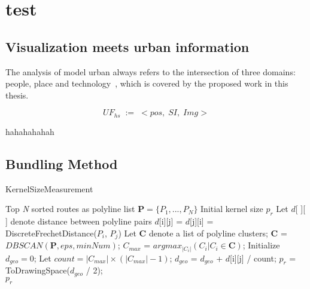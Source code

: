 \chapter{test}


\section{Visualization meets urban information}

 
The analysis of model urban always refers to the intersection of three domains: people, place and technology~\cite{foth2011urban}, which is covered by the proposed work in this thesis.

\vspace*{-2mm}
\begin{equation}
\label{c1_eq_sv}
UF_{hs} \; := \; <pos, \; SI, \; Img>
\end{equation}


hahahahahah
\section{Bundling Method}
\label{sec:bundling}
\begin{algorithm}[h]
	\caption{KernelSizeMeasurement}\label{al:kernel_size_measurement}
	\begin{algorithmic}[1]
		\Require Top \textit{N} sorted routes as polyline list $\textbf{P} = \{P_1, ..., P_N\}$
		\Ensure Initial kernel size $p_r$		
		\State Let $d$[ ][ ] denote distance between polyline pairs
		\State $d$[i][j] = $d$[j][i] = DiscreteFrechetDistance($P_i$, $P_j$)
		\EndFor
		\EndFor
		\State Let \textbf{C} denote a list of polyline clusters;
		\State \textbf{C} = $DBSCAN(\textbf{P}, eps, minNum)$;
		\State $C_{max}$ = $argmax_{|C_i|}(C_i | C_i \in \textbf{C})$;
		\State Initialize $d_{geo} = 0$;
		\State Let $count = |C_{max}| \times (|C_{max}| - 1)$;
		\State $d_{geo}$ = $d_{geo}$ + $d$[i][j] / count;
		\EndFor
		\EndFor
		\State $p_r$ = ToDrawingSpace($d_{geo}$ / 2); \\
		\Return $p_r$
	\end{algorithmic}
\end{algorithm}